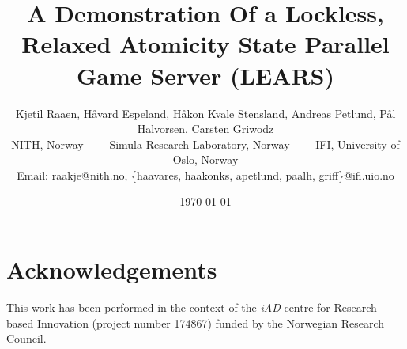 \documentclass[conference]{IEEEtran}
\begin{document}
\title{A Demonstration Of a Lockless, Relaxed Atomicity State Parallel Game Server (LEARS)}

\author{
  Kjetil Raaen, H{\aa}vard Espeland, H{\aa}kon Kvale Stensland,
  Andreas Petlund, P{\aa}l Halvorsen, Carsten Griwodz\\
  NITH, Norway \ \ \ \ Simula Research Laboratory, Norway \ \ \ \ 
  IFI, University of Oslo, Norway\\
  Email: raakje@nith.no, \{haavares, haakonks, apetlund, paalh, griff\}@ifi.uio.no
}


\date{\today}
\maketitle







\section*{Acknowledgements}
\noindent
This work has been performed in the context of the  \textit{iAD} centre for
Research-based Innovation (project number 174867) funded by the
Norwegian Research Council.



\end{document}
